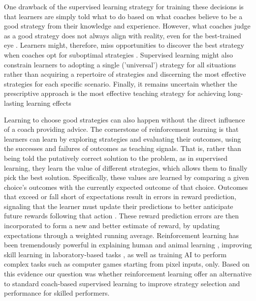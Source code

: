 \documentclass[pdflatex,sn-mathphys-num]{sn-jnl}%
\theoremstyle{thmstyleone}%
\theoremstyle{thmstyletwo}%
\theoremstyle{thmstylethree}%
\begin{document}
One drawback of the supervised learning strategy for training these decisions is that learners are simply told what to do based on what coaches believe to be a good strategy from their knowledge and experience. However, what coaches judge as a good strategy does not always align with reality, even for the best-trained eye \cite{supej_impact_2019, cochrum_visual_2021}. Learners might, therefore, miss opportunities to discover the best strategy when coaches opt for suboptimal strategies \cite{gray_plateaus_2017}. Supervised learning might also constrain learners to adopting a single ('universal') strategy for all situations rather than acquiring a repertoire of strategies and discerning the most effective strategies for each specific scenario. Finally, it remains uncertain whether the prescriptive approach is the most effective teaching strategy for achieving long-lasting learning effects \cite{wulf_instructions_1997, hodges_role_1999, williams_practice_2005,williams_effective_2023} 

Learning to choose good strategies can also happen without the direct influence of a coach providing advice. The cornerstone of reinforcement learning \cite{sutton_reinforcement_2018} is that learners can learn by exploring strategies and evaluating their outcomes, using the successes and failures of outcomes as teaching signals. That is, rather than being told the putatively correct solution to the problem, as in supervised learning, they learn the value of different strategies, which allows them to finally pick the best solution. Specifically, these values are learned by comparing a given choice's outcomes with the currently expected outcome of that choice. Outcomes that exceed or fall short of expectations result in errors in reward prediction, signaling that the learner must update their predictions to better anticipate future rewards following that action \cite{rescorla_theory_1972}. These reward prediction errors are then incorporated to form a new and better estimate of reward, by updating expectations through a weighted running average. Reinforcement learning has been tremendously powerful in explaining human and animal learning \cite{waelti_dopamine_2001, schultz_neural_1997, pessiglione_dopamine-dependent_2006}, improving skill learning in laboratory-based tasks \cite{lior_shmuelof_overcoming_2012, abe_reward_2011, truong_error-based_2023, hasson_reinforcement_2015}, as well as training AI to perform complex tasks such as computer games starting from pixel inputs, only\cite{mnih_human-level_2015}. Based on this evidence our question was whether reinforcement learning offer an alternative to standard coach-based supervised learning to improve strategy selection and performance for skilled performers.
\end{document}
